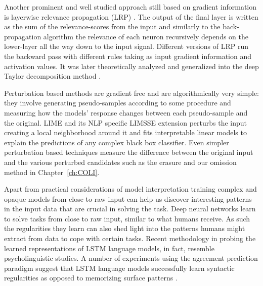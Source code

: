 Another prominent and well studied
approach still based on gradient information is layerwise
relevance propagation (LRP) \citep{bach2015pixel}. The output of the final layer
is written as the sum of the relevance-scores from the input and similarly to the back-propagation
algorithm the relevance of each neuron
recursively depends on the lower-layer all the way down to the input signal.
Different versions of LRP run the backward pass with different rules taking as
input gradient information and activation values. It was later theoretically analyzed and generalized
into the deep Taylor decomposition method \citep{binder2016layer}.


Perturbation based methods are gradient free and are algorithmically very simple: they involve generating
pseudo-samples according to some procedure and measuring how the models' response changes
between each pseudo-sample and the original.
LIME \citep{ribeiro2016should} and its NLP specific LIMSSE extension
\citep{poerner2018evaluating} perturbs
the input creating a local neighborhood around it and fits interpretable linear models to explain
the predictions of any complex black box classifier.
Even simpler perturbation based techniques measure the
difference between the original input and the various perturbed candidates such as the erasure
\citep{li2016understanding} and our omission \citep{Kadar2016} method in Chapter~\ref{ch:COLI}.

Apart from practical considerations of model interpretation training complex and opaque models
from close to raw input can help us discover interesting patterns in the input data that
are crucial in solving the task.
Deep neural networks learn to solve tasks from close to raw input, similar to
what humans receive. As such the regularities they learn can also shed light into the patterns
humans might extract from data to cope with certain tasks.
Recent methodology in probing the learned representations of LSTM language models,
in fact, resemble psycholinguistic studies.
A number of experiments using the agreement prediction paradigm
\citep{bock1991broken} suggest that LSTM language models successfully learn
syntactic regularities as opposed to memorizing surface patterns
\citep{linzen2016assessing,enguehard2017exploring,bernardy2017using,gulordava2018colorless}.


